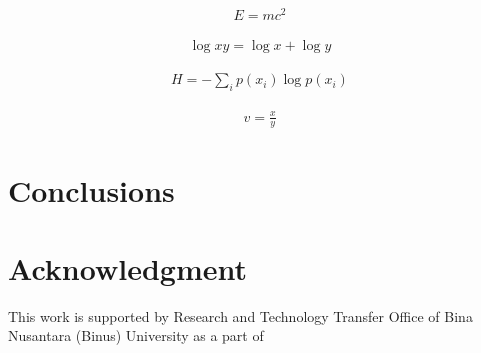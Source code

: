 \documentclass[conference, a4paper]{IEEEtran}
\begin{document}
    \begin{align*}
      E = mc^2
    \end{align*}

    \begin{align*}
      \log xy = \log x + \log y
    \end{align*}
    
    \begin{align*}
      H = - \sum_i p(x_i) \log p(x_i)
    \end{align*}
    
    \begin{align*}
      v = \frac{x}{y}
    \end{align*}



\section{Conclusions}
\label{sec:conclusion}

\lipsum[3]



\section*{Acknowledgment}
This work is supported by Research and Technology Transfer Office of Bina Nusantara (Binus) University as a part of



\end{document}

